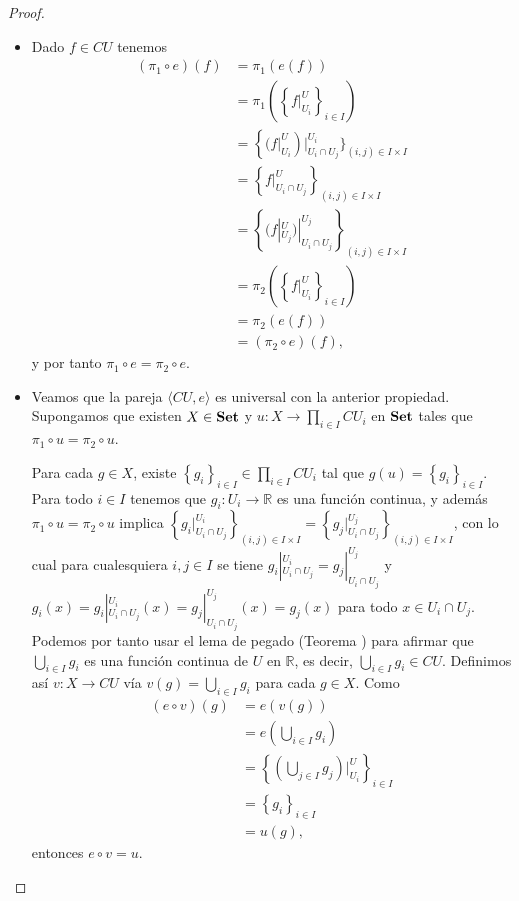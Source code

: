 \begin{proof}
   \begin{itemize}
      \item Dado $f\in CU$ tenemos
         $$
         \begin{aligned}
            (\pi_1\circ e)(f)&=\pi_1(e(f))\\
                             &=\pi_1\left(\left\lbrace f|^U_{U_i}\right\rbrace_{i\in I}\right)\\
                             &=\left\lbrace (f|^U_{U_i}\right)|^{U_i}_{U_i\cap U_j}\rbrace_{(i,j)\in I\times I}\\
                             &=\left\lbrace f|^U_{U_i\cap U_j}\right\rbrace_{(i,j)\in I\times I}\\
                             &=\left\lbrace (f|^U_{U_j})|^{U_j}_{U_i\cap U_j}\right\rbrace_{(i,j)\in I\times I}\\
                             &=\pi_2\left(\left\lbrace f|^U_{U_i}\right\rbrace_{i\in I}\right)\\
                             &=\pi_2(e(f))\\
                             &=(\pi_2\circ e)(f),
         \end{aligned}
         $$
         y por tanto $\pi_1\circ e=\pi_2\circ e$.
      \item Veamos que la pareja $\langle CU,e\rangle$ es universal con la anterior propiedad. Supongamos que existen $X\in\normalfont{\textbf{Set}}$ y $u:X\to\prod_{i\in I}CU_i$ en $\normalfont{\textbf{Set}}$ tales que $\pi_1\circ u=\pi_2\circ u$.
         
         Para cada $g\in X$, existe $\left\lbrace g_i\right\rbrace_{i\in I}\in\prod_{i\in I}CU_i$ tal que $g(u)=\left\lbrace g_i\right\rbrace_{i\in I}$. Para todo $i\in I$ tenemos que $g_i:U_i\to \mathbb{R}$ es una función continua, y además $\pi_1\circ u=\pi_2\circ u$ implica $\left\lbrace {g_i}|^{U_i}_{U_i\cap U_j}\right\rbrace_{(i,j)\in I\times I}=\left\lbrace {g_j}|^{U_j}_{U_i\cap U_j}\right\rbrace_{(i,j)\in I\times I}$, con lo cual para cualesquiera $i,j\in I$ se tiene $g_i|^{U_i}_{U_i\cap U_j}=g_j|^{U_j}_{U_i\cap U_j}$ y $g_i(x)=g_i|^{U_i}_{U_i\cap U_j}(x)=g_j|^{U_j}_{U_i\cap U_j}(x)=g_j(x)$ para todo $x\in U_i\cap U_j$. Podemos por tanto usar el lema de pegado (Teorema ) para afirmar que $\bigcup_{i\in I}g_i$ es una función continua de $U$ en $\mathbb{R}$, es decir, $\bigcup_{i\in I}g_i\in CU$. Definimos así $v:X\to CU$ vía $v(g)=\bigcup_{i\in I}g_i$ para cada $g\in X$. Como 
         $$
         \begin{aligned}
            (e\circ v)(g)&=e(v(g))\\
                         &=e(\bigcup_{i\in I}g_i)\\
                         &=\left\lbrace (\bigcup_{j\in I}g_j)|^U_{U_i}\right\rbrace_{i\in I}\\
                         &=\left\lbrace g_i\right\rbrace_{i\in I}\\
                         &=u(g),
         \end{aligned}
         $$
         entonces $e\circ v=u$.
   \end{itemize}
\end{proof}
